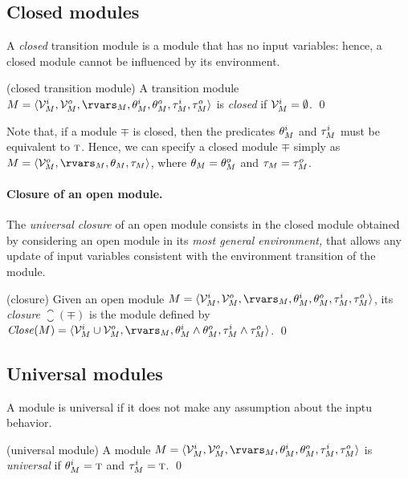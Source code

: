 \documentclass[11pt]{report}
\begin{document}
\subsection{Closed modules}

A {\em closed\/} transition module is a module that has no input
variables: hence, a closed module cannot be influenced by its
environment.

\begin{defi}{(closed transition module)}
A transition module $\mp = \tuple{\ivars_\mp, \ovars_\mp, \rvars_\mp,
\iinit_\mp, \oinit_\mp, \itrans_\mp, \otrans_\mp}$ is {\em closed\/} if
${\cal V}^i_M = \emptyset$.
\qed
\end{defi}

\noindent
Note that, if a module $\mp$ is closed, then the predicates
$\theta^i_M$ and $\tau^i_M$ must be equivalent to $\mbox{\sc t}$.
Hence, we can specify a closed module $\mp$ simply as
$\mp = \tuple{\ovars_\mp, \rvars_\mp, \init_\mp, \trans_\mp}$, where
$\theta_M=\theta^o_M$ and $\tau_M=\tau^o_M$.

\paragraph{Closure of an open module.}
The {\em universal closure\/} of an open module consists in the closed
module obtained by considering an open module in its {\em most general
environment,} that allows any update of input variables consistent with
the environment transition of the module.

\begin{defi}{(closure)}
Given an open module  $\mp = \tuple{\ivars_\mp, \ovars_\mp,
\rvars_\mp, \iinit_\mp, \oinit_\mp, \itrans_\mp, \otrans_\mp}$, its
{\em closure\/} $\closure(\mp)$ is the module defined by
$\closure(\mp) = \tuple{\ivars_\mp \union \ovars_\mp, \rvars_\mp,
\iinit_\mp \und \oinit_\mp, \itrans_\mp \und \otrans_\mp}$.
\qed
\end{defi}

\subsection{Universal modules}

A module is universal if it does not make any assumption about the
inptu behavior.

\begin{defi}{(universal module)}
A module  $\mp = \tuple{\ivars_\mp, \ovars_\mp,
\rvars_\mp, \iinit_\mp, \oinit_\mp, \itrans_\mp, \otrans_\mp}$ is
{\em universal\/} if $\theta^i_M = \mbox{\sc t}$ and $\tau^i_M = \mbox{\sc t}$.
\qed
\end{defi}
\end{document}
